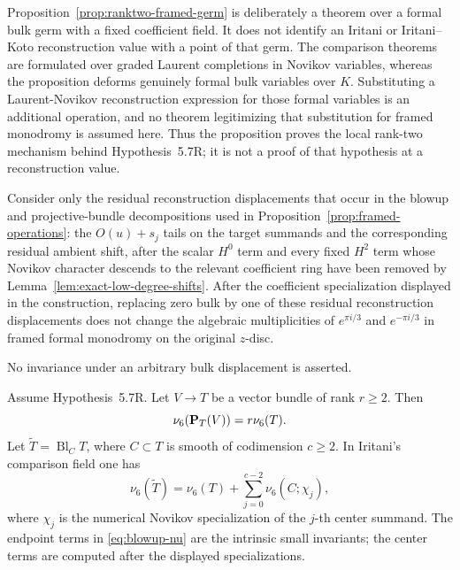 \begin{remark}
\label{rem:ranktwo-germ-scope}
Proposition~\ref{prop:ranktwo-framed-germ} is deliberately a theorem over a
formal bulk germ with a fixed coefficient field.  It does not identify an
Iritani or Iritani--Koto reconstruction value with a point of that germ.
The comparison theorems are formulated over graded Laurent completions in
Novikov variables, whereas the proposition deforms genuinely formal bulk
variables over $K$.  Substituting a Laurent-Novikov reconstruction expression
for those formal variables is an additional operation, and no theorem
legitimizing that substitution for framed monodromy is assumed here.  Thus
the proposition proves the local rank-two mechanism behind
Hypothesis~5.7R; it is not a proof of that hypothesis at a reconstruction
value.
\end{remark}

\begin{hypothesisR}
Consider only the residual reconstruction displacements that occur in the
blowup and projective-bundle decompositions used in
Proposition~\ref{prop:framed-operations}: the $O(u)+s_j$ tails on the target
summands and the corresponding residual ambient shift, after the scalar
$H^0$ term and every fixed $H^2$ term whose Novikov character descends to
the relevant coefficient ring have been removed by
Lemma~\ref{lem:exact-low-degree-shifts}.  After the coefficient
specialization displayed in the construction, replacing zero bulk by one of
these residual reconstruction displacements does not change the algebraic
multiplicities of $e^{\pi i/3}$ and $e^{-\pi i/3}$ in framed formal
monodromy on the original $z$-disc.

No invariance under an arbitrary bulk displacement is asserted.
\end{hypothesisR}



\begin{proposition}
\label{prop:framed-operations}
%
%
Assume Hypothesis~5.7R.
Let \(V\to T\) be a vector bundle of rank \(r\ge2\).  Then
\[
 \nu_6(\mathbf P_T(V))=r\nu_6(T).
 \label{eq:projective-bundle-nu}
\]
Let \(\widetilde T=\operatorname{Bl}_C T\), where \(C\subset T\) is smooth of
codimension \(c\ge2\).  In Iritani's comparison field one has
\[
 \nu_6(\widetilde T)=\nu_6(T)+
 \sum_{j=0}^{c-2}\nu_6(C;\chi_j),
 \label{eq:blowup-nu}
\]
where \(\chi_j\) is the numerical Novikov specialization of the \(j\)-th
center summand.  The endpoint terms in \eqref{eq:blowup-nu} are the intrinsic small
invariants; the center terms are computed after the displayed specializations.
\end{proposition}

